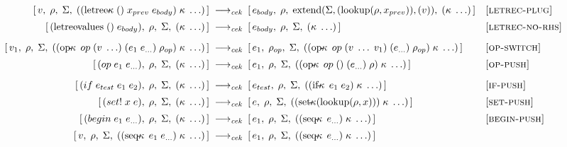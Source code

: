 \begin{figure}[!htbp]
{\begin{minipage}{0.93\textwidth}
\begin{align*}
%
        [\,v,\;\rho,\;\Sigma,\;((\operatorname{letrec\!-\!\kappa}\;()\;x_{prev}\;e_{body})\;\kappa\;\ldots)\,]
        &\;\longrightarrow_{\textit{cek}}\;
        [\,e_{body},\;\rho,\;\operatorname{extend}(\Sigma,(\operatorname{lookup}(\rho,x_{prev})),(v)),\;(\kappa\;\ldots)\,]
        &&\textsc{[letrec‑plug]}\\[2pt]
%
        [\,(\operatorname{letrec\!-\!values}\;()\;e_{body}),\;\rho,\;\Sigma,\;(\kappa\;\ldots)\,]
        &\;\longrightarrow_{\textit{cek}}\;
        [\,e_{body},\;\rho,\;\Sigma,\;(\kappa\;\ldots)\,]
        &&\textsc{[letrec‑no‑rhs]}\\[6pt]
%
        [\,v_1,\;\rho,\;\Sigma,\;((\operatorname{op\!-\!\kappa}\;op\;(v\;\ldots)\;(e_1\;e_{\ldots})\;\rho_{op})\;\kappa\;\ldots)\,]
        &\;\longrightarrow_{\textit{cek}}\;
        [\,e_1,\;\rho_{op},\;\Sigma,\;((\operatorname{op\!-\!\kappa}\;op\;(v\;\ldots\;v_1)\;(e_{\ldots})\;\rho_{op})\;\kappa\;\ldots)\,]
        &&\textsc{[op‑switch]}\\[2pt]
%
        [\,(op\;e_1\;e_{\ldots}),\;\rho,\;\Sigma,\;(\kappa\;\ldots)\,]
        &\;\longrightarrow_{\textit{cek}}\;
        [\,e_1,\;\rho,\;\Sigma,\;((\operatorname{op\!-\!\kappa}\;op\;()\;(e_{\ldots})\;\rho)\;\kappa\;\ldots)\,]
        &&\textsc{[op‑push]}\\[6pt]
%
        [\,(if\;e_{test}\;e_1\;e_2),\;\rho,\;\Sigma,\;(\kappa\;\ldots)\,]
        &\;\longrightarrow_{\textit{cek}}\;
        [\,e_{test},\;\rho,\;\Sigma,\;((\operatorname{if\!-\!\kappa}\;e_1\;e_2)\;\kappa\;\ldots)\,]
        &&\textsc{[if‑push]}\\[2pt]
%
        [\,(set!\;x\;e),\;\rho,\;\Sigma,\;(\kappa\;\ldots)\,]
        &\;\longrightarrow_{\textit{cek}}\;
        [\,e,\;\rho,\;\Sigma,\;((\operatorname{set\!-\!\kappa}(\operatorname{lookup}(\rho,x)))\;\kappa\;\ldots)\,]
        &&\textsc{[set‑push]}\\[2pt]
%
        [\,(begin\;e_1\;e_{\ldots}),\;\rho,\;\Sigma,\;(\kappa\;\ldots)\,]
        &\;\longrightarrow_{\textit{cek}}\;
        [\,e_1,\;\rho,\;\Sigma,\;((\operatorname{seq\!-\!\kappa}\;e_{\ldots})\;\kappa\;\ldots)\,]
        &&\textsc{[begin‑push]}\\[2pt]
%
        [\,v,\;\rho,\;\Sigma,\;((\operatorname{seq\!-\!\kappa}\;e_1\;e_{\ldots})\;\kappa\;\ldots)\,]
        &\;\longrightarrow_{\textit{cek}}\;
        [\,e_1,\;\rho,\;\Sigma,\;((\operatorname{seq\!-\!\kappa}\;e_{\ldots})\;\kappa\;\ldots)\,]

\end{align*}
\end{minipage}}
\end{figure}
